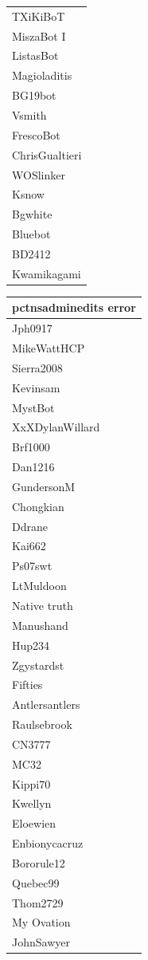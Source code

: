 \documentclass{article}
\begin{document}
\begin{landscape}
\begin{table}
\begin{center}
\begin{tabular}{l}
TXiKiBoT \\
MiszaBot I \\
ListasBot \\
Magioladitis \\
BG19bot \\
Vsmith \\
FrescoBot \\
ChrisGualtieri \\
WOSlinker \\
Ksnow \\
Bgwhite \\
Bluebot \\
BD2412 \\
Kwamikagami \\
\end{tabular}
\begin{tabular}{l}
\hline
pctnsadminedits error \\
\hline 
Jph0917 \\
MikeWattHCP \\
Sierra2008 \\
Kevinsam \\
MystBot \\
XxXDylanWillard \\
Brf1000 \\
Dan1216 \\
GundersonM \\
Chongkian \\
Ddrane \\
Kai662 \\
Ps07swt \\
LtMuldoon \\
Native truth \\
Manushand \\
Hup234 \\
Zgystardst \\
Fifties \\
Antlersantlers \\
Raulsebrook \\
CN3777 \\
MC32 \\
Kippi70 \\
Kwellyn \\
Eloewien \\
Enbionycacruz \\
Bororule12 \\
Quebec99 \\
Thom2729 \\
My Ovation \\
JohnSawyer \\

\end{tabular}
\end{center}
\end{table}
\end{landscape}
\end{document}
